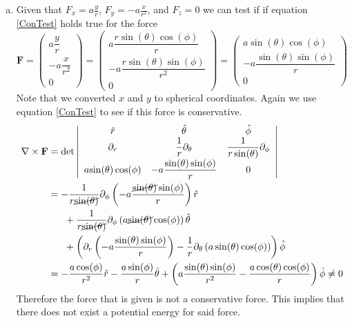 \documentclass[11pt]{article}
\numberwithin{equation}{section}
\begin{document}
\begin{enumerate}[(a)]
\item Given that $F_x = a\frac{y}{r}$, $F_y=-a\frac{x}{r^2}$, and $F_z=0$ we can test if if 
equation \ref{ConTest} holds true for the force 
$$\mathbf{F} = \left(\begin{array}{c}
                        a\dfrac{y}{r}\\
                        -a\dfrac{x}{r^2}\\
                        0
            \end{array}\right)
= \left(\begin{array}{c}
                        a\dfrac{r\sin(\theta)\cos(\phi)}{r}\\
                        -a\dfrac{r\sin(\theta)\sin(\phi)}{r^2}\\
                        0
  \end{array}\right)
= \left(\begin{array}{c}
                        a{\sin(\theta)\cos(\phi)}\\
                        -a\dfrac{\sin(\theta)\sin(\phi)}{r}\\
                        0
  \end{array}\right)$$
Note that we converted $x$ and $y$ to spherical coordinates. Again we use equation 
\ref{ConTest} to see if this force is conservative.
\begin{align*}
\bold\nabla\times\mathbf{F} &= \det\left|\begin{array}{ccc} 
 \hat{r}                    &\hat{\theta}                        &\hat{\phi}\\
 \partial_r                 &\dfrac{1}{r}\partial_{\theta}       &\dfrac{1}{r\sin(\theta)}\partial_{\phi}\\
 a{\sin(\theta)\cos(\phi)}  &-a\dfrac{\sin(\theta)\sin(\phi)}{r} &0
                          \end{array}\right|\\
&= -\frac{1}{r\cancel{\sin(\theta)}}\partial_{\phi}\left(-a\frac{\cancel{\sin(\theta)}\sin(\phi)}{r}\right)\hat{r}\\
& \ \ \ \ \ + \frac{1}{r\cancel{\sin(\theta)}}\partial_{\phi}\left(a{\cancel{\sin(\theta)}\cos(\phi)}\right)\hat{\theta}\\ 
& \ \ \ \ \ + \left(\partial_{r}\left(-a\dfrac{\sin(\theta)\sin(\phi)}{r}\right) - \frac{1}{r}\partial_{\theta}\left(a\sin(\theta)\cos(\phi)\right)\right)\hat{\phi}\\
&= -\frac{a\cos(\phi)}{r^2}\hat{r} - \frac{a\sin(\phi)}{r}\hat{\theta} 
   + \left(a\dfrac{\sin(\theta)\sin(\phi)}{r^2} 
   - \frac{a\cos(\theta)\cos(\phi)}{r}\right)\hat{\phi} \ne 0
\end{align*}
Therefore the force that is given is not a conservative force. This implies that there does
not exist a potential energy for said force.
\end{enumerate}
\pagebreak
\end{document}

